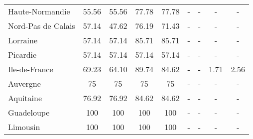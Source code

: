 \begin{table}[H]
\begin{tabularx}{\textwidth}{Xcccccccc}
            Haute-Normandie  & 55.56 & 55.56 & 77.78 & 77.78 & - & - & - & - \\
            Nord-Pas de Calais & 57.14 & 47.62 & 76.19 & 71.43 & - & - & - & - \\
            Lorraine & 57.14 & 57.14 & 85.71 & 85.71 & - & - & - & - \\
            Picardie & 57.14 & 57.14 & 57.14 & 57.14 & - & - & - & - \\
            Ile-de-France & 69.23 & 64.10 & 89.74 & 84.62 & - & - & 1.71 & 2.56 \\
            Auvergne & 75 & 75 & 75 & 75 & - & - & - & - \\
            Aquitaine & 76.92 & 76.92 & 84.62 & 84.62 & - & - & - & - \\
            Guadeloupe & 100 & 100 & 100 & 100 & - & - & - & - \\
            Limousin & 100 & 100 & 100 & 100 & - & - & - & - \\
            \bottomrule
        \end{tabularx}
    \end{table}
    
